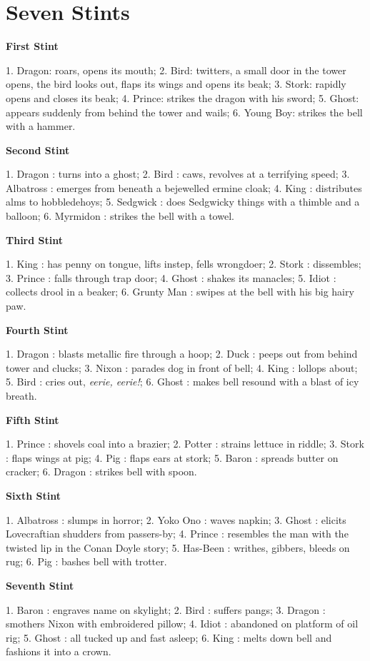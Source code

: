 \chapter{Seven Stints}
\begingroup
\setlength{\parindent}{0in}
\setlength{\parskip}{\baselineskip}

\textbf{First Stint}
\nopagebreak

1. Dragon: roars, opens its mouth; 2. Bird: twitters, a small door in the tower opens, the bird looks out, flaps its wings and opens its beak; 3. Stork: rapidly opens and closes its beak; 4. Prince: strikes the dragon with his sword; 5. Ghost: appears suddenly from behind the tower and wails; 6. Young Boy: strikes the bell with a hammer.

\textbf{Second Stint}
\nopagebreak

1. Dragon : turns into a ghost; 2. Bird : caws, revolves at a terrifying speed; 3. Albatross : emerges from beneath a bejewelled ermine cloak; 4. King : distributes alms to hobbledehoys; 5. Sedgwick : does Sedgwicky things with a thimble and a balloon; 6. Myrmidon : strikes the bell with a towel.

\textbf{Third Stint}
\nopagebreak

1. King : has penny on tongue, lifts instep, fells wrongdoer; 2. Stork : dissembles; 3. Prince : falls through trap door; 4. Ghost : shakes its manacles; 5. Idiot : collects drool in a beaker; 6. Grunty Man : swipes at the bell with his big hairy paw.

\textbf{Fourth Stint}
\nopagebreak

1. Dragon : blasts metallic fire through a hoop; 2. Duck : peeps out from behind tower and clucks; 3. Nixon : parades dog in front of bell; 4. King : lollops about; 5. Bird : cries out, \emph{eerie, eerie!}; 6. Ghost : makes bell resound with a blast of icy breath.

\textbf{Fifth Stint}
\nopagebreak

1. Prince : shovels coal into a brazier; 2. Potter : strains lettuce in riddle; 3. Stork : flaps wings at pig; 4. Pig : flaps ears at stork; 5. Baron : spreads butter on cracker; 6. Dragon : strikes bell with spoon.

\textbf{Sixth Stint}
\nopagebreak

1. Albatross : slumps in horror; 2. Yoko Ono : waves napkin; 3. Ghost : elicits Lovecraftian shudders from passers-by; 4. Prince : resembles the man with the twisted lip in the Conan Doyle story; 5. Has-Been : writhes, gibbers, bleeds on rug; 6. Pig : bashes bell with trotter.

\textbf{Seventh Stint}
\nopagebreak

1. Baron : engraves name on skylight; 2. Bird : suffers pangs; 3. Dragon : smothers Nixon with embroidered pillow; 4. Idiot : abandoned on platform of oil rig; 5. Ghost : all tucked up and fast asleep; 6. King : melts down bell and fashions it into a crown.
\endgroup